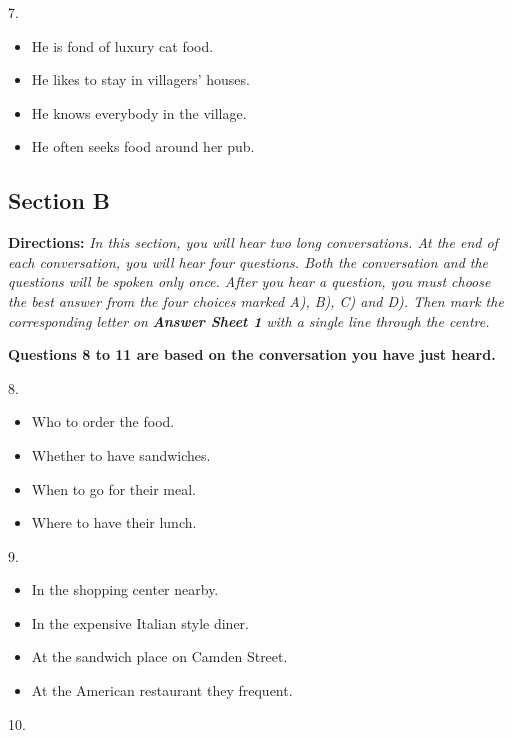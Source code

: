 \documentclass[UTF8,11pt]{ctexart}
\begin{document}
7.


\begin{itemize}[leftmargin=2em,itemsep=.2em,topsep=.4em]\item[A.] He is fond of luxury cat food.
\item[B.] He likes to stay in villagers’ houses.
\item[C.] He knows everybody in the village.
\item[D.] He often seeks food around her pub.
\end{itemize}

\subsection*{\textbf{Section B}}


\textbf{Directions:} \textit{In this section, you will hear two long conversations. At the end of each conversation, you will hear} \textit{four questions. Both the conversation and the questions will be spoken only once. After you hear a question, you} \textit{must choose the best answer from the four choices marked A), B), C) and D). Then mark the corresponding letter} \textit{on }\textbf{\textit{Answer Sheet 1}}\textit{ with a single line through the centre.}


\textbf{Questions 8 to 11 are based on the conversation you have just heard.}


8.


\begin{itemize}[leftmargin=2em,itemsep=.2em,topsep=.4em]\item[A.] Who to order the food.
\item[B.] Whether to have sandwiches.
\item[C.] When to go for their meal.
\item[D.] Where to have their lunch.
\end{itemize}

9.


\begin{itemize}[leftmargin=2em,itemsep=.2em,topsep=.4em]\item[A.] In the shopping center nearby.
\item[B.] In the expensive Italian style diner.
\item[C.] At the sandwich place on Camden Street.
\item[D.] At the American restaurant they frequent.
\end{itemize}

10.
\end{document}
